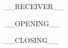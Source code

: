 \documentclass[
  fontsize=12pt,
  paper=a4,
  parskip=half,
  enlargefirstpage=on,
  fromalign=right,
  fromphone=off,
  fromrule=aftername,
  addrfield=on,
  backaddress=on,
  subject=beforeopening,
  locfield=narrow,
  foldmarks=on,
  numericaldate=on,
  headsepline=on,
  firstfoot=on,
]{scrlttr2}
\begin{document}
\begin{letter}{__RECEIVER__}
\opening{__OPENING__}

\blindtext

\Blindtext

\closing{__CLOSING__}
\end{letter}
\end{document}
